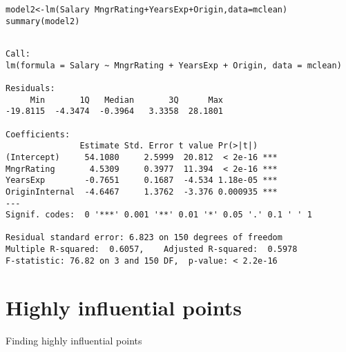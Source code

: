 \documentclass{beamer}\usepackage[]{graphicx}\usepackage[]{color}
\makeatletter
\newcommand{\hlopt}[1]{\textcolor[rgb]{1,0.894,0.769}{#1}}%
\newcommand{\hlstd}[1]{\textcolor[rgb]{1,0.894,0.769}{#1}}%
\newcommand{\hlkwb}[1]{\textcolor[rgb]{0.804,0.776,0.451}{#1}}%
\newcommand{\hlkwc}[1]{\textcolor[rgb]{0.78,0.941,0.545}{#1}}%
\newcommand{\hlkwd}[1]{\textcolor[rgb]{1,0.78,0.769}{#1}}%
\newenvironment{kframe}{%
 \def\at@end@of@kframe{}%
 \ifinner\ifhmode%
  \def\at@end@of@kframe{\end{minipage}}%
  \begin{minipage}{\columnwidth}%
 \fi\fi%
 \def\FrameCommand##1{\hskip\@totalleftmargin \hskip-\fboxsep
 \colorbox{shadecolor}{##1}\hskip-\fboxsep
     \hskip-\linewidth \hskip-\@totalleftmargin \hskip\columnwidth}%
 \MakeFramed {\advance\hsize-\width
   \@totalleftmargin\z@ \linewidth\hsize
   \@setminipage}}%
 {\par\unskip\endMakeFramed%
 \at@end@of@kframe}
\newenvironment{knitrout}{}{} %
\makeatother
\begin{document}
\begin{darkframes}
    \begin{frame}[fragile]%
      \fontsize{9}{9}\selectfont
\begin{knitrout}
\begin{kframe}
\begin{alltt}
\hlstd{model2} \hlkwb{<-} \hlkwd{lm}\hlstd{(Salary} \hlopt{~} \hlstd{MngrRating} \hlopt{+} \hlstd{YearsExp} \hlopt{+} \hlstd{Origin,} \hlkwc{data}\hlstd{=mclean)}
\hlkwd{summary}\hlstd{(model2)}
\end{alltt}
\begin{verbatim}

Call:
lm(formula = Salary ~ MngrRating + YearsExp + Origin, data = mclean)

Residuals:
     Min       1Q   Median       3Q      Max 
-19.8115  -4.3474  -0.3964   3.3358  28.1801 

Coefficients:
               Estimate Std. Error t value Pr(>|t|)    
(Intercept)     54.1080     2.5999  20.812  < 2e-16 ***
MngrRating       4.5309     0.3977  11.394  < 2e-16 ***
YearsExp        -0.7651     0.1687  -4.534 1.18e-05 ***
OriginInternal  -4.6467     1.3762  -3.376 0.000935 ***
---
Signif. codes:  0 '***' 0.001 '**' 0.01 '*' 0.05 '.' 0.1 ' ' 1

Residual standard error: 6.823 on 150 degrees of freedom
Multiple R-squared:  0.6057,	Adjusted R-squared:  0.5978 
F-statistic: 76.82 on 3 and 150 DF,  p-value: < 2.2e-16
\end{verbatim}
\end{kframe}
\end{knitrout}
    \end{frame}

    \section{Highly influential points}

    \begin{frame}[fragile]{Finding highly influential points}
\begin{knitrout}


\end{knitrout}
    \end{frame}


\end{darkframes}
\end{document}

